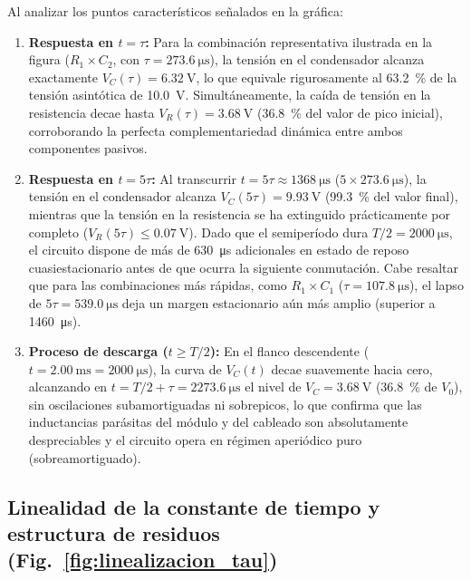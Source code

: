 Al analizar los puntos característicos señalados en la gráfica:
\begin{enumerate}
    \item \textbf{Respuesta en $t = \tau$:} Para la combinación representativa ilustrada en la figura ($R_1 \times C_2$, con $\tau = \qty{273,6}{\micro\second}$), la tensión en el condensador alcanza exactamente $V_C(\tau) = \qty{6,32}{\volt}$, lo que equivale rigurosamente al \qty{63,2}{\percent} de la tensión asintótica de \qty{10,0}{\volt}. Simultáneamente, la caída de tensión en la resistencia decae hasta $V_R(\tau) = \qty{3,68}{\volt}$ (\qty{36,8}{\percent} del valor de pico inicial), corroborando la perfecta complementariedad dinámica entre ambos componentes pasivos.
    \item \textbf{Respuesta en $t = 5\tau$:} Al transcurrir $t = 5\tau \approx \qty{1368}{\micro\second}$ ($5 \times \qty{273,6}{\micro\second}$), la tensión en el condensador alcanza $V_C(5\tau) = \qty{9,93}{\volt}$ (\qty{99,3}{\percent} del valor final), mientras que la tensión en la resistencia se ha extinguido prácticamente por completo ($V_R(5\tau) \le \qty{0,07}{\volt}$). Dado que el semiperíodo dura $T/2 = \qty{2000}{\micro\second}$, el circuito dispone de más de \qty{630}{\micro\second} adicionales en estado de reposo cuasiestacionario antes de que ocurra la siguiente conmutación. Cabe resaltar que para las combinaciones más rápidas, como $R_1 \times C_1$ ($\tau = \qty{107,8}{\micro\second}$), el lapso de $5\tau = \qty{539,0}{\micro\second}$ deja un margen estacionario aún más amplio (superior a \qty{1460}{\micro\second}).
    \item \textbf{Proceso de descarga ($t \ge T/2$):} En el flanco descendente ($t = \qty{2,00}{\milli\second} = \qty{2000}{\micro\second}$), la curva de $V_C(t)$ decae suavemente hacia cero, alcanzando en $t = T/2 + \tau = \qty{2273,6}{\micro\second}$ el nivel de $V_C = \qty{3,68}{\volt}$ (\qty{36,8}{\percent} de $V_0$), sin oscilaciones subamortiguadas ni sobrepicos, lo que confirma que las inductancias parásitas del módulo y del cableado son absolutamente despreciables y el circuito opera en régimen aperiódico puro (sobreamortiguado).
\end{enumerate}

\subsection{Linealidad de la constante de tiempo y estructura de residuos (Fig.~\ref{fig:linealizacion_tau})}

